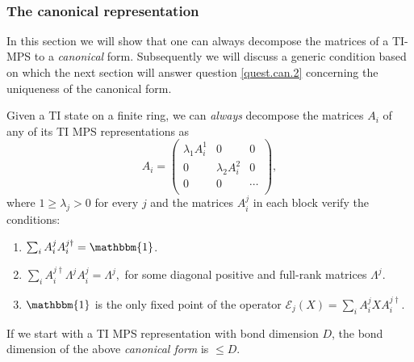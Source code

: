 \documentclass[aps,prl,epsfig,graphics,floatfix,mathbbm,a4paper]{article}
\newcommand{\E}{\mathcal{E}}
\newcommand{\1}{\mathbbm{1}}
\renewcommand{\>}{\rangle}
\newcommand{\<}{\langle}
\begin{document}
\


\subsubsection{The canonical representation}

In this section we will show that one can always decompose the
matrices of a TI-MPS to a {\it canonical} form. Subsequently we
will discuss a generic condition based on which the next section
will answer question \ref{quest.can.2} concerning the uniqueness
of the canonical form.


\begin{theorem}\label{Th:TIcanonical} Given a TI state
    on a finite ring, we can {\it always} decompose the matrices $A_i$
    of any of its TI MPS representations as
    $$A_i=\left(%
        \begin{array}{ccc}
                \lambda_1 A_i^1 & 0               & 0      \\
                0               & \lambda_2 A_i^2 & 0      \\
                0               & 0               & \cdots \\
            \end{array}%
        \right),$$ where $1\ge \lambda_j>0$ for every $j$ and the matrices
    $A_i^j$ in each block verify the conditions:
    \begin{enumerate}
        \item $\sum_i A_i^jA_i^{j\dagger}=\mathbbm {1}$. \item $\sum_i
                  A_i^{j\dagger}\Lambda^j A_i^j=\Lambda^j,$  for some diagonal
              positive and full-rank matrices $\Lambda^j$. \item $\mathbbm {1}$
              is the only fixed point of the operator $\E_j(X)=\sum_i
                  A_i^jXA_i^{j\dagger}$.
    \end{enumerate}

    If we start with a TI MPS representation with bond dimension $D$,
    the bond dimension of the above {\em canonical form} is $\le D$.
\end{theorem}
\end{document}
